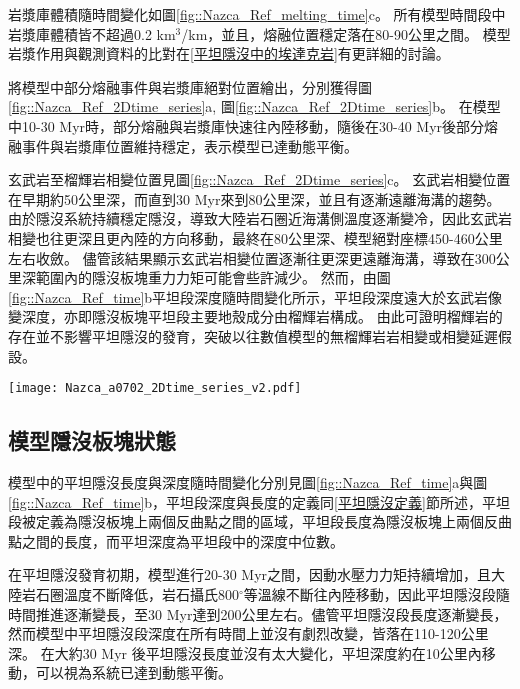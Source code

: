 岩漿庫體積隨時間變化如圖\ref{fig::Nazca_Ref_melting_time}c。
所有模型時間段中岩漿庫體積皆不超過0.2 km$^3$/km，並且，熔融位置穩定落在80-90公里之間。
模型岩漿作用與觀測資料的比對在\ref{平坦隱沒中的埃達克岩}有更詳細的討論。


將模型中部分熔融事件與岩漿庫絕對位置繪出，分別獲得圖\ref{fig::Nazca_Ref_2Dtime_series}a, 圖\ref{fig::Nazca_Ref_2Dtime_series}b。
在模型中10-30 Myr時，部分熔融與岩漿庫快速往內陸移動，隨後在30-40 Myr後部分熔融事件與岩漿庫位置維持穩定，表示模型已達動態平衡。

玄武岩至榴輝岩相變位置見圖\ref{fig::Nazca_Ref_2Dtime_series}c。
玄武岩相變位置在早期約50公里深，而直到30 Myr來到80公里深，並且有逐漸遠離海溝的趨勢。
由於隱沒系統持續穩定隱沒，導致大陸岩石圈近海溝側溫度逐漸變冷，因此玄武岩相變也往更深且更內陸的方向移動，最終在80公里深、模型絕對座標450-460公里左右收斂。
儘管該結果顯示玄武岩相變位置逐漸往更深更遠離海溝，導致在300公里深範圍內的隱沒板塊重力力矩可能會些許減少。
然而，由圖\ref{fig::Nazca_Ref_time}b平坦段深度隨時間變化所示，平坦段深度遠大於玄武岩像變深度，亦即隱沒板塊平坦段主要地殼成分由榴輝岩構成。
由此可證明榴輝岩的存在並不影響平坦隱沒的發育，突破以往數值模型的無榴輝岩岩相變或相變延遲假設。
\begin{figure*}[h]
    \centering
    \texttt{[image: Nazca\_a0702\_2Dtime\_series\_v2.pdf]}
    \caption[智利參考模型部分熔融、岩漿庫與玄武岩相變時空關係圖]{智利參考模型部分熔融、岩漿庫與玄武岩相變位置時空關係圖。(a)圓點為智利參考模型不同時間的部分熔融發生位置，線條為每10 Myr的隱沒板塊頂部介面(分別為10 Myr, 20nMyr, 30 Myr, 40 Myr與50 Myr)，橫軸上方標示出模型於40 Myr的相對海溝距離。(b)圓點為智利參考模型不同時間的岩漿庫發生位置，線條為每10 Myr的隱沒板塊頂部介面(分別為10 Myr, 20 Myr, 30 Myr, 40 Myr與50 Myr)，橫軸上方標示出模型於40 Myr的相對海溝距離。(c)圓點為智利參考模型不同時間之玄武岩相變位置。}
    \label{fig::Nazca_Ref_2Dtime_series}
\end{figure*}

\newpage
\subsection{模型隱沒板塊狀態}
模型中的平坦隱沒長度與深度隨時間變化分別見圖\ref{fig::Nazca_Ref_time}a與圖\ref{fig::Nazca_Ref_time}b，平坦段深度與長度的定義同\ref{平坦隱沒定義}節所述，平坦段被定義為隱沒板塊上兩個反曲點之間的區域，平坦段長度為隱沒板塊上兩個反曲點之間的長度，而平坦深度為平坦段中的深度中位數。

在平坦隱沒發育初期，模型進行20-30 Myr之間，因動水壓力力矩持續增加，且大陸岩石圈溫度不斷降低，岩石攝氏800$^{\circ}$等溫線不斷往內陸移動，因此平坦隱沒段隨時間推進逐漸變長，至30 Myr達到200公里左右。儘管平坦隱沒段長度逐漸變長，然而模型中平坦隱沒段深度在所有時間上並沒有劇烈改變，皆落在110-120公里深。
在大約30 Myr 後平坦隱沒長度並沒有太大變化，平坦深度約在10公里內移動，可以視為系統已達到動態平衡。

